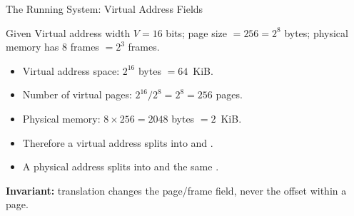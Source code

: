 \documentclass[aspectratio=169]{beamer}
\begin{document}
\begin{frame}{The Running System: Virtual Address Fields}
  \begin{exampleblock}{Given}
    Virtual address width $V=16$ bits; page size $=256=2^8$ bytes; physical
    memory has 8 frames $=2^3$ frames.
  \end{exampleblock}
  \begin{itemize}
    \item Virtual address space: $2^{16}$ bytes $=64$~KiB.
    \item Number of virtual pages: $2^{16}/2^8=2^8=256$ pages.
    \item Physical memory: $8\times256=2048$ bytes $=2$~KiB.
    \item Therefore a virtual address splits into
       and .
    \item A physical address splits into 
      and the same .
  \end{itemize}
  \vspace{0.1cm}
  \textbf{Invariant:} translation changes the page/frame field, never the
  offset within a page.
\end{frame}
\end{document}
